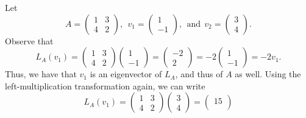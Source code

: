 \begin{eg}
    Let 
    \[  A = \begin{pmatrix} 
        1 & 3 \\
        4 & 2 
              \end{pmatrix}, \ \ {v}_{1} = \begin{pmatrix} 
        1 \\
        -1 
    \end{pmatrix}, \ \ \text{and} \ \ {v}_{2} = \begin{pmatrix} 
               3 \\
               4
              \end{pmatrix}. \]
    Observe that
        \[ {L}_{A}({v}_{1}) = \begin{pmatrix} 
            1 & 3 \\
            4 & 2 
                  \end{pmatrix} \begin{pmatrix} 
                             1 \\
                             -1 
                            \end{pmatrix}  = \begin{pmatrix} 
                                       -2 \\
                                       2 
                                      \end{pmatrix}  = -2 \begin{pmatrix} 
                                                 1 \\
                                                 -1 
                                                \end{pmatrix} = -2 {v}_{1}. \] 
    Thus, we have that \( {v}_{1} \) is an eigenvector of \( {L}_{A} \), and thus of \( A  \) as well. Using the left-multiplication transformation again, we can write
    \[  {L}_{A}({v}_{1}) = \begin{pmatrix} 
        1 & 3 \\
        4 & 2 
              \end{pmatrix} \begin{pmatrix} 
                         3 \\
                         4
                        \end{pmatrix}  = \begin{pmatrix} 
                                   15 \\

\end{pmatrix}\]
\end{eg}
